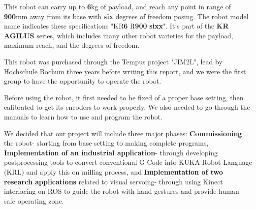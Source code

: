This robot can carry up to \textbf{6}kg of payload, and reach any point in range of \textbf{900}mm away from its base with \textbf{six} degrees of freedom posing. The robot model name indicates these specifications "KR\textbf{6} R\textbf{900} \textbf{sixx}". It's part of the \textbf{KR AGILUS} series, which includes many other robot varieties for the payload, maximum reach, and the degrees of freedom. 

This robot was purchased through the Tempus project "JIM2L", lead by Hochschule Bochum three years before writing this report, and we were the first group to have the opportunity to operate the robot.
 
Before using the robot, it first needed to be fixed of a proper base setting, then calibrated to get its encoders to work properly. We also needed to go through the manuals to learn how to use and program the robot. 

 We decided that our project will include three major phases: \textbf{Commissioning} the robot- starting from base setting to making complete programs,  \textbf{Implementation of an industrial application}- through developing postprocessing tools to convert conventional G-Code into KUKA Robot Language (KRL) and apply this on milling process, and \textbf{ Implementation of two research applications} related to visual servoing- through using Kinect interfacing on ROS to guide the robot with hand gestures and provide human-safe operating zone.
 \bigskip	
 
	

	
	
